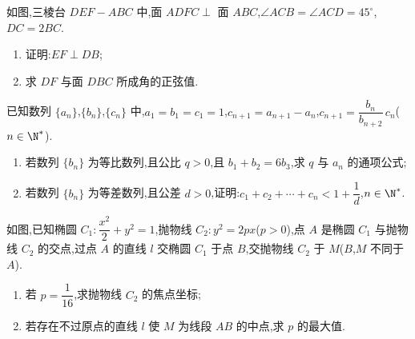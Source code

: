 \begin{problem}
如图,三棱台 \(DEF-ABC\) 中,面 \(ADFC\perp\) 面 \(ABC\),\(\angle ACB=\angle ACD=45^\circ\),\(DC=2BC\).

\begin{enumerate}
\item 证明:\(EF\perp DB\);

\item 求 \(DF\) 与面 \(DBC\) 所成角的正弦值.
\end{enumerate}

\begin{center}
\end{center}
\end{problem}

\begin{problem}
已知数列 \(\{a_n\}\),\(\{b_n\}\),\(\{c_n\}\) 中,\(a_1=b_1=c_1=1\),\(c_{n+1}=a_{n+1}-a_n\),\(c_{n+1}=\dfrac{b_n}{b_{n+2}}\,c_n\)(\(n\in\N^*\)).

\begin{enumerate}
\item 若数列 \(\{b_n\}\) 为等比数列,且公比 \(q>0\),且 \(b_1+b_2=6b_3\),求 \(q\) 与 \(a_n\) 的通项公式;

\item 若数列 \(\{b_n\}\) 为等差数列,且公差 \(d>0\),证明:\(c_1+c_2+\cdots+c_n<1+\dfrac1d\),\(n\in\N^*\).
\end{enumerate}
\end{problem}

\begin{problem}
如图,已知椭圆 \(C_1:\dfrac{x^2}{2}+y^2=1\),抛物线 \(C_2:y^2=2px\)(\(p>0\)),点 \(A\) 是椭圆 \(C_1\) 与抛物线 \(C_2\) 的交点,过点 \(A\) 的直线 \(l\) 交椭圆 \(C_1\) 于点 \(B\),交抛物线 \(C_2\) 于 \(M\)(\(B\),\(M\) 不同于 \(A\)).

\begin{enumerate}
\item 若 \(p=\dfrac{1}{16}\),求抛物线 \(C_2\) 的焦点坐标;

\item 若存在不过原点的直线 \(l\) 使 \(M\) 为线段 \(AB\) 的中点,求 \(p\) 的最大值.
\end{enumerate}

\begin{center}
\end{center}
\end{problem}

